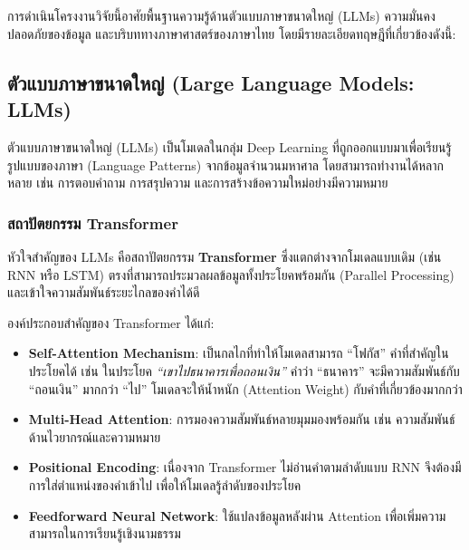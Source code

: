 \chapter{\fi}

การดำเนินโครงงานวิจัยนี้อาศัยพื้นฐานความรู้ด้านตัวแบบภาษาขนาดใหญ่ (LLMs) ความมั่นคงปลอดภัยของข้อมูล
และบริบททางภาษาศาสตร์ของภาษาไทย โดยมีรายละเอียดทฤษฎีที่เกี่ยวข้องดังนี้:

\section{ตัวแบบภาษาขนาดใหญ่ (Large Language Models: LLMs)}

ตัวแบบภาษาขนาดใหญ่ (LLMs) เป็นโมเดลในกลุ่ม Deep Learning ที่ถูกออกแบบมาเพื่อเรียนรู้รูปแบบของภาษา
(Language Patterns) จากข้อมูลจำนวนมหาศาล โดยสามารถทำงานได้หลากหลาย เช่น การตอบคำถาม การสรุปความ
และการสร้างข้อความใหม่อย่างมีความหมาย

\subsection{สถาปัตยกรรม Transformer}

หัวใจสำคัญของ LLMs คือสถาปัตยกรรม \textbf{Transformer} ซึ่งแตกต่างจากโมเดลแบบเดิม (เช่น RNN หรือ LSTM)
ตรงที่สามารถประมวลผลข้อมูลทั้งประโยคพร้อมกัน (Parallel Processing) และเข้าใจความสัมพันธ์ระยะไกลของคำได้ดี

องค์ประกอบสำคัญของ Transformer ได้แก่:
\begin{itemize}\sloppy
  \item \textbf{Self-Attention Mechanism}: เป็นกลไกที่ทำให้โมเดลสามารถ ``โฟกัส'' คำที่สำคัญในประโยคได้
    เช่น ในประโยค \textit{``เขาไปธนาคารเพื่อถอนเงิน''} คำว่า ``ธนาคาร'' จะมีความสัมพันธ์กับ ``ถอนเงิน''
    มากกว่า ``ไป'' โมเดลจะให้น้ำหนัก (Attention Weight) กับคำที่เกี่ยวข้องมากกว่า
  \item \textbf{Multi-Head Attention}: การมองความสัมพันธ์หลายมุมมองพร้อมกัน
    เช่น ความสัมพันธ์ด้านไวยากรณ์และความหมาย
  \item \textbf{Positional Encoding}: เนื่องจาก Transformer ไม่อ่านคำตามลำดับแบบ RNN
    จึงต้องมีการใส่ตำแหน่งของคำเข้าไป เพื่อให้โมเดลรู้ลำดับของประโยค
  \item \textbf{Feedforward Neural Network}: ใช้แปลงข้อมูลหลังผ่าน Attention
    เพื่อเพิ่มความสามารถในการเรียนรู้เชิงนามธรรม
\end{itemize}


